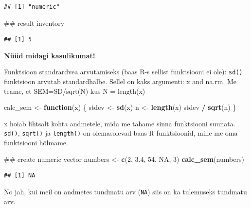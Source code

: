 \documentclass[]{book}
\newenvironment{Shaded}{\begin{snugshade}}{\end{snugshade}}
\newcommand{\KeywordTok}[1]{\textcolor[rgb]{0.13,0.29,0.53}{\textbf{#1}}}
\newcommand{\DecValTok}[1]{\textcolor[rgb]{0.00,0.00,0.81}{#1}}
\newcommand{\FloatTok}[1]{\textcolor[rgb]{0.00,0.00,0.81}{#1}}
\newcommand{\StringTok}[1]{\textcolor[rgb]{0.31,0.60,0.02}{#1}}
\newcommand{\OtherTok}[1]{\textcolor[rgb]{0.56,0.35,0.01}{#1}}
\newcommand{\ControlFlowTok}[1]{\textcolor[rgb]{0.13,0.29,0.53}{\textbf{#1}}}
\newcommand{\OperatorTok}[1]{\textcolor[rgb]{0.81,0.36,0.00}{\textbf{#1}}}
\newcommand{\NormalTok}[1]{#1}
\begin{document}
\begin{verbatim}
## [1] "numeric"
\end{verbatim}

\begin{Shaded}
\begin{Highlighting}[]
\NormalTok{## result}
\NormalTok{inventory}
\end{Highlighting}
\end{Shaded}

\begin{verbatim}
## [1] 5
\end{verbatim}

\textbf{Nüüd midagi kasulikumat!}

Funktsioon standrardvea arvutamiseks (baas R-s sellist funktsiooni ei
ole): \texttt{sd()} funktsioon arvutab standardhälbe. Sellel on kaks
argumenti: x and na.rm. Me teame, et SEM=SD/sqrt(N) kus N = length(x)

\begin{Shaded}
\begin{Highlighting}[]
\NormalTok{calc_sem <-}\StringTok{ }\ControlFlowTok{function}\NormalTok{(x) \{}
\NormalTok{  stdev <-}\StringTok{ }\KeywordTok{sd}\NormalTok{(x)}
\NormalTok{  n <-}\StringTok{ }\KeywordTok{length}\NormalTok{(x)}
\NormalTok{  stdev }\OperatorTok{/}\StringTok{ }\KeywordTok{sqrt}\NormalTok{(n)}
\NormalTok{\}}
\end{Highlighting}
\end{Shaded}

x hoiab lihtsalt kohta andmetele, mida me tahame sinna funktsiooni
suunata. \texttt{sd()}, \texttt{sqrt()} ja \texttt{length()} on
olemasolevad baas R funktsioonid, mille me oma funktsiooni hõlmame.

\begin{Shaded}
\begin{Highlighting}[]
\NormalTok{## create numeric vector}
\NormalTok{numbers <-}\StringTok{ }\KeywordTok{c}\NormalTok{(}\DecValTok{2}\NormalTok{, }\FloatTok{3.4}\NormalTok{, }\DecValTok{54}\NormalTok{, }\OtherTok{NA}\NormalTok{, }\DecValTok{3}\NormalTok{)}
\KeywordTok{calc_sem}\NormalTok{(numbers)}
\end{Highlighting}
\end{Shaded}

\begin{verbatim}
## [1] NA
\end{verbatim}

No jah, kui meil on andmetes tundmatu arv (\texttt{NA}) siis on ka
tulemuseks tundmatu arv.
\end{document}
